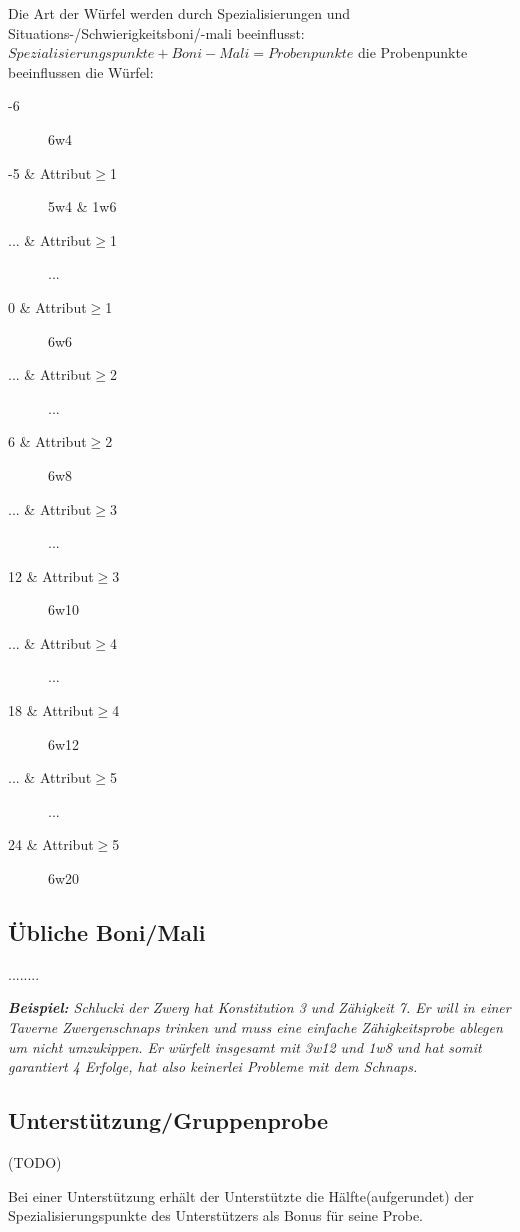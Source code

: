 Die Art der Würfel werden durch Spezialisierungen und Situations-/Schwierigkeitsboni/-mali beeinflusst: $Spezialisierungspunkte+Boni-Mali=Probenpunkte$ die Probenpunkte beeinflussen die Würfel:
\begin{description}
\item[-6] 6w4
\item[-5 \& Attribut$\geq$1] 5w4 \& 1w6
\item[... \& Attribut$\geq$1] ...
\item[0 \& Attribut$\geq$1] 6w6
\item[... \& Attribut$\geq$2] ...
\item[6 \& Attribut$\geq$2] 6w8
\item[... \& Attribut$\geq$3] ...
\item[12 \& Attribut$\geq$3] 6w10
\item[... \& Attribut$\geq$4] ...
\item[18 \& Attribut$\geq$4] 6w12
\item[... \& Attribut$\geq$5] ...
\item[24 \& Attribut$\geq$5] 6w20
\end{description}

\subsection{Übliche Boni/Mali}

........

\textit{\textbf{Beispiel:} 
Schlucki der Zwerg hat Konstitution 3 und Zähigkeit 7. Er will in einer Taverne Zwergenschnaps trinken und muss eine einfache Zähigkeitsprobe ablegen um nicht umzukippen. Er würfelt insgesamt mit 3w12 und 1w8 und hat somit garantiert 4 Erfolge, hat also keinerlei Probleme mit dem Schnaps. }


\subsection{Unterstützung/Gruppenprobe}
(TODO)

Bei einer Unterstützung erhält der Unterstützte die Hälfte(aufgerundet) der Spezialisierungspunkte des Unterstützers als Bonus für seine Probe.

